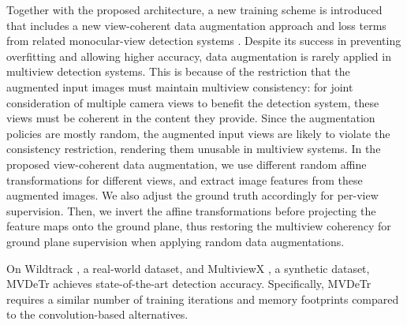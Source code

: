 \documentclass[sigconf,authorversion,nonacm]{acmart}
\begin{document}
Together with the proposed architecture, a new training scheme is introduced that includes a new view-coherent data augmentation approach and loss terms from related monocular-view detection systems \cite{lin2017focal,law2018cornernet,zhou2019objects}. 
Despite its success in preventing overfitting and allowing higher accuracy, data augmentation is rarely applied in multiview detection systems. This is because of the restriction that the augmented input images must maintain multiview consistency: for joint consideration of multiple camera views to benefit the detection system, these views must be coherent in the content they provide. Since the augmentation policies are mostly random, the augmented input views are likely to violate the consistency restriction, rendering them unusable in multiview systems. 
In the proposed view-coherent data augmentation, we use different random affine transformations
for different views, and extract image features from these augmented images. We also adjust the ground truth accordingly for per-view supervision. Then, we invert the affine transformations before projecting the feature maps onto the ground plane, thus restoring the multiview coherency for ground plane supervision when applying random data augmentations. 



On Wildtrack \cite{chavdarova2018wildtrack}, a real-world dataset, and MultiviewX \cite{hou2020multiview}, a synthetic dataset, MVDeTr achieves state-of-the-art detection accuracy. Specifically, MVDeTr requires a similar number of training iterations and memory footprints compared to the convolution-based alternatives. 
\end{document}
